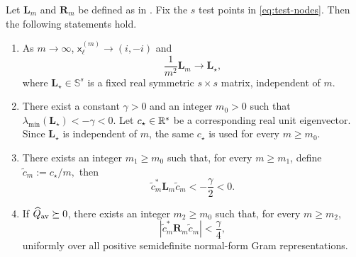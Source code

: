 \begin{proposition}
\label{lem:negative-limit}
Let $\mathbf L_m$ and $\mathbf R_m$ be defined as in
.  Fix the $s$ test points in
\eqref{eq:test-nodes}.  Then the following statements hold.
\begin{enumerate}

\item As $m\to\infty$,
$
\mathsf x_\ell^{(m)}\to(i,-i)
$
and
\begin{equation}\label{eq:L-limit}
        \frac{1}{m^2}\mathbf L_m\longrightarrow\mathbf L_\star,
\end{equation}
where
$
\mathbf L_\star\in\mathbb S^s
$
is a fixed real symmetric $s\times s$ matrix, independent of $m$.

\item There exist a constant $\gamma>0$ and an integer $m_0>0$ such that $
        \lambda_{\min}(\mathbf L_\star)<-\gamma<0. $
Let $c_\star\in\mathbb{R}^s$ be a corresponding real unit eigenvector.  Since
$\mathbf L_\star$ is independent of $m$, the same $c_\star$ is used for
every $m\ge m_0$.  

\item There exists an integer $m_1\ge m_0$ such that, for every
$m\ge m_1$, define
$
\widetilde c_m:=c_\star/m, 
$ then
\begin{equation}\label{eq:L-negative-limit}
 \widetilde c_m^*\mathbf L_m\widetilde c_m
 < -\frac{\gamma}{2}<0 .
\end{equation}

\item If $\widehat Q_{\rm av}\succeq0$, there exists an integer
$m_2\ge m_0$ such that, for every $m\ge m_2$,
\begin{equation}\label{eq:R-vanishes}
 \left|
 \widetilde c_m^*\mathbf R_m\widetilde c_m
 \right|
 <\frac{\gamma}{4},
\end{equation}
uniformly over all positive semidefinite normal-form Gram
representations.
\end{enumerate}
\end{proposition}

